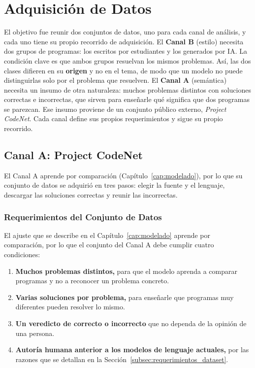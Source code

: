 \section{Adquisición de Datos}
\label{sec:adquisicion_datos}

El objetivo fue reunir dos conjuntos de datos, uno para cada canal de análisis, y cada uno tiene su propio recorrido de adquisición. El \textbf{Canal B} (estilo) necesita dos grupos de programas: los escritos por estudiantes y los generados por IA. La condición clave es que ambos grupos resuelvan los mismos problemas. Así, las dos clases difieren en su \textbf{origen} y no en el tema, de modo que un modelo no puede distinguirlas solo por el problema que resuelven. El \textbf{Canal A} (semántica) necesita un insumo de otra naturaleza: muchos problemas distintos con soluciones correctas e incorrectas, que sirven para enseñarle qué significa que dos programas se parezcan. Ese insumo proviene de un conjunto público externo, \textit{Project CodeNet}. Cada canal define sus propios requerimientos y sigue su propio recorrido.

\subsection{Canal A: Project CodeNet}
\label{subsec:adquisicion_canal_a}

El Canal A aprende por comparación (Capítulo~\ref{cap:modelado}), por lo que su conjunto de datos se adquirió en tres pasos: elegir la fuente y el lenguaje, descargar las soluciones correctas y reunir las incorrectas.

\subsubsection{Requerimientos del Conjunto de Datos}
\label{subsec:requerimientos_canal_a}

El ajuste que se describe en el Capítulo~\ref{cap:modelado} aprende por comparación, por lo que el conjunto del Canal A debe cumplir cuatro condiciones:

\begin{enumerate}
    \item \textbf{Muchos problemas distintos,} para que el modelo aprenda a comparar programas y no a reconocer un problema concreto.
    \item \textbf{Varias soluciones por problema,} para enseñarle que programas muy diferentes pueden resolver lo mismo.
    \item \textbf{Un veredicto de correcto o incorrecto} que no dependa de la opinión de una persona.
    \item \textbf{Autoría humana anterior a los modelos de lenguaje actuales,} por las razones que se detallan en la Sección~\ref{subsec:requerimientos_dataset}.
\end{enumerate}

